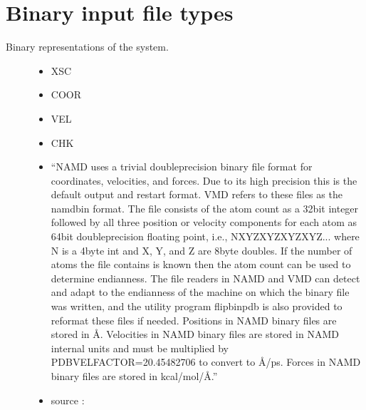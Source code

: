 \documentclass[letterpaper,10pt,english]{sphinxmanual}
\begin{document}
\section{Binary input file types}
\label{\detokenize{input_file:binary-input-file-types}}\begin{description}
\item[{Binary representations of the system.}] \leavevmode\begin{itemize}
\item {} 
\sphinxAtStartPar
XSC

\item {} 
\sphinxAtStartPar
COOR

\item {} 
\sphinxAtStartPar
VEL

\item {} 
\sphinxAtStartPar
CHK

\item {} 
\sphinxAtStartPar
“NAMD uses a trivial double\sphinxhyphen{}precision binary file format for coordinates, velocities, and forces. Due to its high precision this is the default output and restart format. VMD refers to these files as the \textasciigrave{}\textasciigrave{}namdbin\textquotesingle{}\textquotesingle{} format. The file consists of the atom count as a 32\sphinxhyphen{}bit integer followed by all three position or velocity components for each atom as 64\sphinxhyphen{}bit double\sphinxhyphen{}precision floating point, i.e., NXYZXYZXYZXYZ... where N is a 4\sphinxhyphen{}byte int and X, Y, and Z are 8\sphinxhyphen{}byte doubles. If the number of atoms the file contains is known then the atom count can be used to determine endianness. The file readers in NAMD and VMD can detect and adapt to the endianness of the machine on which the binary file was written, and the utility program flipbinpdb is also provided to reformat these files if needed. Positions in NAMD binary files are stored in Å. Velocities in NAMD binary files are stored in NAMD internal units and must be multiplied by PDBVELFACTOR=20.45482706 to convert to Å/ps. Forces in NAMD binary files are stored in kcal/mol/Å.”

\end{itemize}
\begin{itemize}
\item {} 
\sphinxAtStartPar
source : 

\end{itemize}

\end{description}
\end{document}

